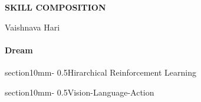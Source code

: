 \documentclass[11pt,a4paper]{article}
\makeatletter
\renewcommand{\section}{\@startsection%
{section}{1}{0mm}{-\baselineskip}%
{0.5\baselineskip}{\normalfont\Large\bfseries}}%
\makeatother
\begin{document}


\pagestyle{plain}

\begin{center} 
\bfseries\uppercase{Skill composition}
\end{center}
\vspace{-0.3cm}
\centerline{{Vaishnava Hari}}


\paragraph{Dream}
    

\section{Hirarchical Reinforcement Learning}
    

\section{Vision-Language-Action}
    

%     

%     

%     




\end{document}
